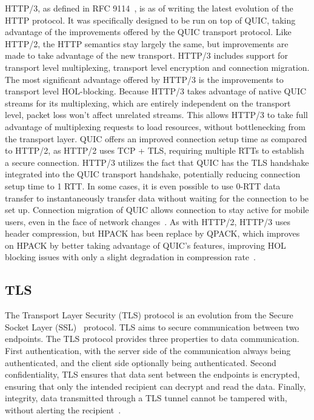 \documentclass[english, 12pt, a4paper, elec, utf8, a-2b, online]{aaltothesis}
\begin{document}
HTTP/3, as defined in RFC 9114~\cite{rfc9114}, is as of writing the latest evolution
of the HTTP protocol. It was specifically designed to be run on top of QUIC,
taking advantage of the improvements offered by the QUIC transport protocol. Like HTTP/2,
the HTTP semantics stay largely the same, but improvements are made to take advantage
of the new transport. HTTP/3 includes support for transport level multiplexing,
transport level encryption and connection migration. The most significant advantage
offered by HTTP/3 is the improvements to transport level HOL-blocking. Because HTTP/3
takes advantage of native QUIC streams for its multiplexing, which are entirely independent
on the transport level, packet loss won't affect unrelated streams. This allows
HTTP/3 to take full advantage of multiplexing requests to load resources, without
bottlenecking from the transport layer. QUIC offers an improved connection setup
time as compared to HTTP/2, as HTTP/2 uses TCP + TLS, requiring multiple RTTs to
establish a secure connection. HTTP/3 utilizes the fact that QUIC has the TLS
handshake integrated into the QUIC transport handshake, potentially reducing
connection setup time to 1 RTT. In some cases, it is even possible to use 0-RTT
data transfer to instantaneously transfer data without waiting for the connection
to be set up. Connection migration of QUIC allows connection to stay active for mobile
users, even in the face of network changes~\cite{rfc9114}. As with HTTP/2, HTTP/3 uses header compression,
but HPACK has been replace by QPACK, which improves on HPACK by better taking advantage
of QUIC's features, improving HOL blocking issues with only a slight degradation
in compression rate~\cite{rfc9204}.


\subsection{TLS}
\label{sec:tls}
The Transport Layer  Security (TLS) protocol is an evolution from the Secure Socket Layer (SSL)~\cite{rfc6101} protocol.
TLS aims to secure communication between two endpoints. The TLS protocol provides three
properties to data communication. First authentication, with the server side of the
communication always being authenticated, and the client side optionally being
authenticated. Second confidentiality, TLS ensures that data sent between the
endpoints is encrypted, ensuring that only the intended recipient can
decrypt and read the data. Finally, integrity, data transmitted through
a TLS tunnel cannot be tampered with, without alerting the recipient~\cite{rfc8446}.
\end{document}

